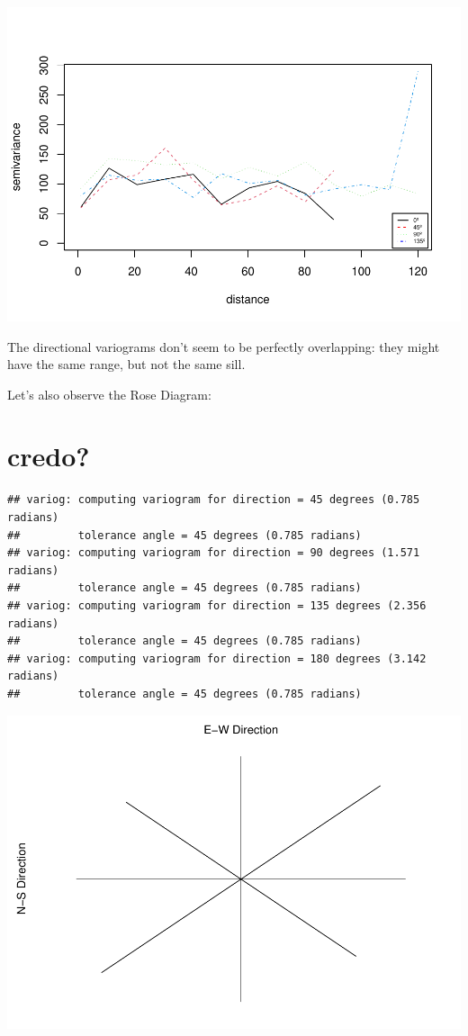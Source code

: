 \documentclass[
]{article}
\begin{document}
\includegraphics{Assignment_1_files/figure-latex/unnamed-chunk-22-1.pdf}

The directional variograms don't seem to be perfectly overlapping: they
might have the same range, but not the same sill.

Let's also observe the Rose Diagram:

\hypertarget{credo}{%
\section{credo?}\label{credo}}

\begin{verbatim}
## variog: computing variogram for direction = 45 degrees (0.785 radians)
##         tolerance angle = 45 degrees (0.785 radians)
## variog: computing variogram for direction = 90 degrees (1.571 radians)
##         tolerance angle = 45 degrees (0.785 radians)
## variog: computing variogram for direction = 135 degrees (2.356 radians)
##         tolerance angle = 45 degrees (0.785 radians)
## variog: computing variogram for direction = 180 degrees (3.142 radians)
##         tolerance angle = 45 degrees (0.785 radians)
\end{verbatim}

\includegraphics{Assignment_1_files/figure-latex/unnamed-chunk-23-1.pdf}
\end{document}
